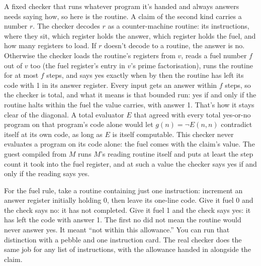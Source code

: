 \documentclass[11pt,twoside]{article}
\theoremstyle{thielethm}
\theoremstyle{thieledef}
\theoremstyle{thieledef}
\theoremstyle{thieledef}
\theoremstyle{thielethm}
\theoremstyle{thieleobs}
\theoremstyle{thielethm}
\begin{document}
A fixed checker that runs whatever program it's handed and always answers needs saying how, so
here is the routine. A claim of the second kind carries a number $r$. The checker decodes $r$
as a counter-machine routine: its instructions, where they sit, which register holds the
answer, which register holds the fuel, and how many registers to load. If $r$ doesn't decode to a
routine, the answer is no. Otherwise the checker loads the routine's registers from $v$, reads a
fuel number $f$ out of $v$ too (the fuel register's entry in $v$'s prime factorisation), runs the
routine for at most $f$ steps, and says yes exactly when by then the routine has left its code
with 1 in its answer register. Every input gets an answer within $f$ steps, so the checker is
total, and what it means is that bounded run: yes if and only if the routine halts within the
fuel the value carries, with answer 1. That's
how it stays clear of the diagonal. A total evaluator $E$ that agreed with every total yes-or-no
program on that program's code alone would let $g(n) = \neg E(n, n)$ contradict itself at its own
code, as long as $E$ is itself computable. This checker never evaluates a program on its code alone: the fuel comes with the claim's
value. The guest compiled from $M$ runs $M$'s reading routine itself and puts at least the step
count it took into the fuel register, and at such a value the checker says yes if and only if the
reading says yes.

For the fuel rule, take a routine containing just one instruction: increment an
answer register initially holding 0, then leave its one-line code. Give it fuel 0
and the check says no: it has not completed. Give it fuel 1 and the check says yes:
it has left the code with answer 1. The first no did not mean the routine would
never answer yes. It meant ``not within this allowance.'' You can run that distinction
with a pebble and one instruction card. The real checker does the same job
for any list of instructions, with the allowance handed in alongside the claim.
\end{document}
